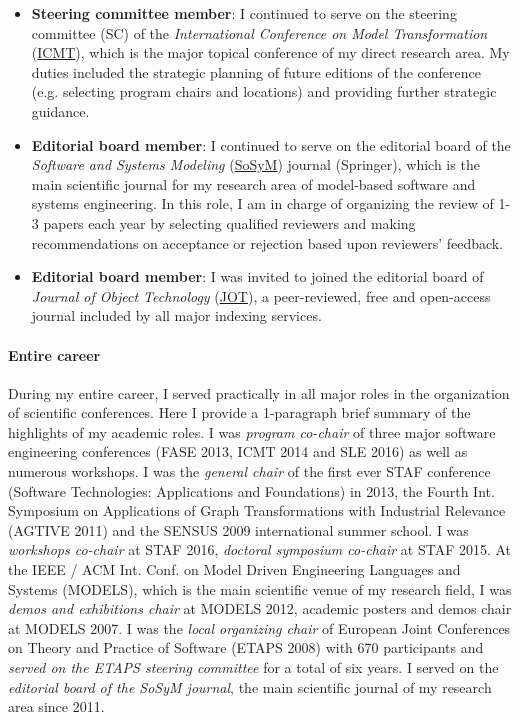 \begin{itemize}[leftmargin=0.5cm]
\item \textbf{Steering committee member}: I continued to serve on the steering committee (SC) of the \emph{International Conference on Model Transformation} (\href{http://www.model-transformation.org/}{ICMT}), which is the major topical conference of my direct research area. My duties included the strategic planning of future editions of the conference (e.g. selecting program chairs and locations) and providing further strategic guidance.

\item \textbf{Editorial board member}: I continued to serve on the editorial board of the \emph{Software and Systems Modeling} (\href{http://sosym.org/}{SoSyM}) journal (Springer), which is the main scientific journal for my research area of model-based software and systems engineering. In this role, I am in charge of organizing the review of 1-3 papers each year by selecting qualified reviewers and making recommendations on acceptance or rejection based upon reviewers' feedback.

\item \textbf{Editorial board member}: I was invited to joined the editorial board of \emph{Journal of Object Technology} (\href{http://www.jot.fm/}{JOT}),  a peer-reviewed, free and open-access journal included by all major indexing services. 
\end{itemize}

\paragraph{Entire career}
During my entire career, I served practically in all major roles in the organization of scientific conferences. Here I provide a 1-paragraph brief summary of the highlights of my academic roles. I was \emph{program co-chair} of three major software engineering conferences (FASE 2013, ICMT 2014 and SLE 2016) as well as numerous workshops. I was the \emph{general chair} of the first ever STAF conference (Software Technologies: Applications and Foundations) in 2013, the Fourth Int. Symposium on Applications of Graph Transformations with Industrial Relevance (AGTIVE 2011) and the SENSUS 2009 international summer school. I was \emph{workshops co-chair} at STAF 2016, \emph{doctoral symposium co-chair} at STAF 2015.
At the IEEE / ACM Int. Conf. on Model Driven Engineering Languages and Systems (MODELS), which is the main scientific venue of my research field, I was \emph{demos and exhibitions chair} at MODELS 2012, academic posters and demos chair at MODELS 2007.  I was the \emph{local organizing chair} of European Joint Conferences on Theory and Practice of Software (ETAPS 2008) with 670 participants and \emph{served on the ETAPS steering committee} for a total of six years. 
I served on the \emph{editorial board of the SoSyM journal}, the main scientific journal of my research area since 2011.  

